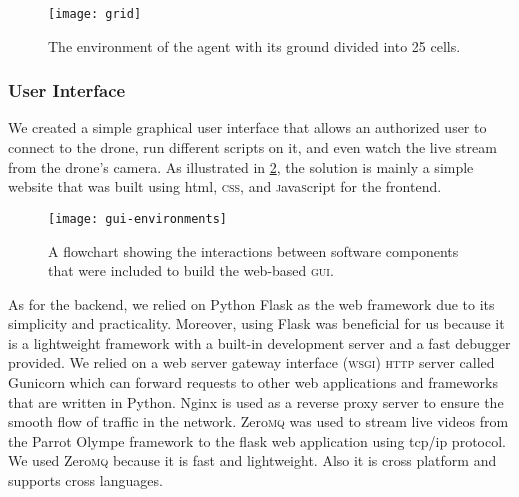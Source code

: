 \documentclass[../main.tex]{subfiles}
\begin{document}
\begin{figure}[tbp]
	\centering
	\texttt{[image: grid]}
	\caption{The environment of the agent with its ground
		divided into 25 cells.}
	\label{fig:grid}
\end{figure}

\subsubsection{User Interface}

We created a simple graphical user interface that allows an authorized user 
to connect to the drone, run different scripts on it, and even watch the live 
stream from the drone's camera. 
As illustrated in \cref{fig:gui-environments}, the solution is mainly a simple 
website that was built using html, \textsc{css}, and \textsc{j}ava\textsc{s}cript for the frontend. 

\begin{figure}[tbp] 
	\centering
	\texttt{[image: gui-environments]} 
        \caption{A flowchart showing the interactions between software
        components that were included to build the web-based
        \textsc{gui}.}
	\label{fig:gui-environments}  
\end{figure}

As for the backend, we relied on Python Flask as the web framework due to 
its simplicity and practicality. Moreover, using Flask was beneficial for us 
because it is a lightweight framework with a built-in development server and a 
fast debugger provided. 
We relied on a web server gateway interface (\textsc{wsgi}) \textsc{http} 
server called Gunicorn which can forward requests to other web applications 
and frameworks that are written in Python.
Nginx is used as a reverse proxy server to ensure the smooth flow 
of traffic in the network. Zero\textsc{mq} was used to stream live videos from the 
Parrot Olympe framework to the flask web application using tcp/ip protocol. 
We used Zero\textsc{mq} because it is fast and lightweight. Also it is cross platform
and supports cross languages.
\end{document}
